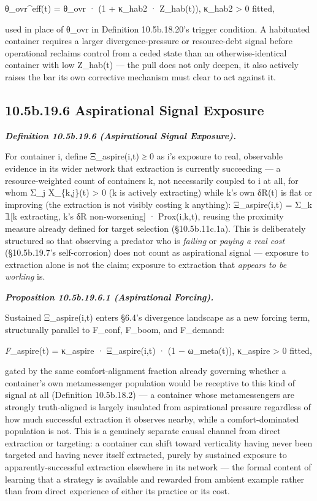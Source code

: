 \documentclass[
]{article}
\begin{document}
θ\_ovr\^{}eff(t) = θ\_ovr · (1 + κ\_hab2 · Z\_hab(t)), κ\_hab2
\textgreater{} 0 fitted,

used in place of θ\_ovr in Definition 10.5b.18.20's trigger condition. A
habituated container requires a larger divergence-pressure or
resource-debt signal before operational reclaims control from a ceded
state than an otherwise-identical container with low Z\_hab(t) --- the
pull does not only deepen, it also actively raises the bar its own
corrective mechanism must clear to act against it.

\hypertarget{b.19.6-aspirational-signal-exposure}{%
\subsection{10.5b.19.6 Aspirational Signal
Exposure}\label{b.19.6-aspirational-signal-exposure}}

\emph{\textbf{Definition 10.5b.19.6 (Aspirational Signal Exposure).}}

For container i, define Ξ\_aspire(i,t) ≥ 0 as i's exposure to real,
observable evidence in its wider network that extraction is currently
succeeding --- a resource-weighted count of containers k, not
necessarily coupled to i at all, for whom Σ\_j X\_\{k,j\}(t)
\textgreater{} 0 (k is actively extracting) while k's own δR(t) is flat
or improving (the extraction is not visibly costing k anything):
Ξ\_aspire(i,t) = Σ\_k 𝟙{[}k extracting, k's δR non-worsening{]} ·
Prox(i,k,t), reusing the proximity measure already defined for target
selection (§10.5b.11c.1a). This is deliberately structured so that
observing a predator who is \emph{failing} or \emph{paying a real cost}
(§10.5b.19.7's self-corrosion) does not count as aspirational signal ---
exposure to extraction alone is not the claim; exposure to extraction
that \emph{appears to be working} is.

\emph{\textbf{Proposition 10.5b.19.6.1 (Aspirational Forcing).}}

Sustained Ξ\_aspire(i,t) enters §6.4's divergence landscape as a new
forcing term, structurally parallel to F\_conf, F\_boom, and F\_demand:

\emph{F}\_aspire(t) = κ\_aspire · Ξ\_aspire(i,t) · (1 − ω\_meta(t)),
κ\_aspire \textgreater{} 0 fitted,

gated by the same comfort-alignment fraction already governing whether a
container's own metamessenger population would be receptive to this kind
of signal at all (Definition 10.5b.18.2) --- a container whose
metamessengers are strongly truth-aligned is largely insulated from
aspirational pressure regardless of how much successful extraction it
observes nearby, while a comfort-dominated population is not. This is a
genuinely separate causal channel from direct extraction or targeting: a
container can shift toward verticality having never been targeted and
having never itself extracted, purely by sustained exposure to
apparently-successful extraction elsewhere in its network --- the formal
content of learning that a strategy is available and rewarded from
ambient example rather than from direct experience of either its
practice or its cost.
\end{document}
